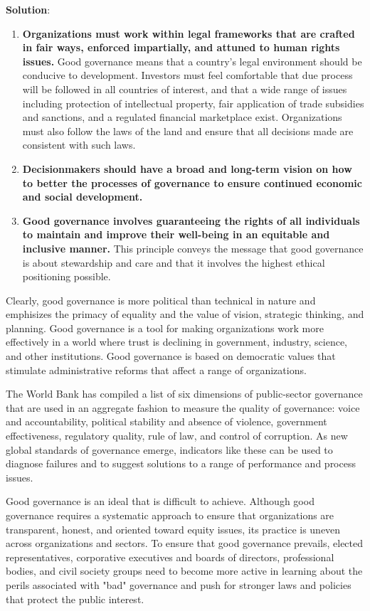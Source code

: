 \documentclass[
]{book}
\newenvironment{solution}{ {\bfseries Solution}:}{}
\begin{document}
\begin{questions}
\begin{solution}
\begin{enumerate}
\item \textbf{Organizations must work within legal frameworks that are crafted in fair ways, enforced impartially, and attuned to human rights issues.} Good governance means that a country’s legal environment should be conducive to development. Investors must feel comfortable that due process will be followed in all countries of interest, and that a wide range of issues including protection of intellectual property, fair application of trade subsidies and sanctions, and a regulated financial marketplace exist. Organizations must also follow the laws of the land and ensure that all decisions made are consistent with such laws.
\item \textbf{Decisionmakers should have a broad and long-term vision on how to better the processes of governance to ensure continued economic and social development.}
\item \textbf{Good governance involves guaranteeing the rights of all individuals to maintain and improve their well-being in an equitable and inclusive manner.} This principle conveys the message that good governance is about stewardship and care and that it involves the highest ethical positioning possible.
\end{enumerate}

Clearly, good governance is more political than technical in nature and emphisizes the primacy of equality and the value of vision, strategic thinking, and planning. Good governance is a tool for making organizations work more effectively in a world where trust is declining in government, industry, science, and other institutions. Good governance is based on democratic values that stimulate administrative reforms that affect a range of organizations.

The World Bank has compiled a list of six dimensions of public-sector governance that are used in an aggregate fashion to measure the quality of governance: voice and accountability, political stability and absence of violence, government effectiveness, regulatory quality, rule of law, and control of corruption. As new global standards of governance emerge, indicators like these can be used to diagnose failures and to suggest solutions to a range of performance and process issues.

Good governance is an ideal that is difficult to achieve. Although good governance requires a systematic approach to ensure that organizations are transparent, honest, and oriented toward equity issues, its practice is uneven across organizations and sectors. To ensure that good governance prevails, elected representatives, corporative executives and boards of directors, professional bodies, and civil society groups need to become more active in learning about the perils associated with "bad" governance and push for stronger laws and policies that protect the public interest.


\end{solution}
\end{questions}
\end{document}
